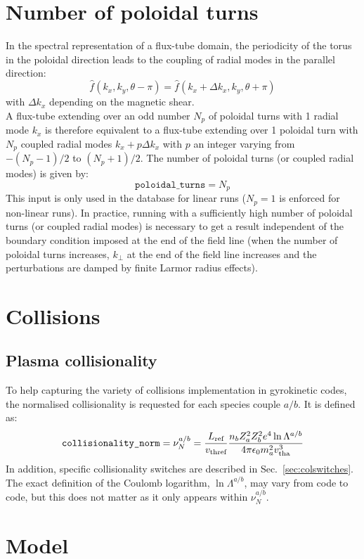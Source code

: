 \documentclass[a4paper]{report}
\begin{document}
\section{Number of poloidal turns} \label{sec:polturns}
In the spectral representation of a flux-tube domain, the periodicity of the torus in the poloidal direction leads to the coupling of radial modes in the parallel direction:
$$\hat{f}(k_x,k_y,\theta-\pi)=\hat{f}(k_x+\Delta k_x,k_y,\theta+\pi)$$
with $\Delta k_x$ depending on the magnetic shear.\\
A flux-tube extending over an odd number $N_p$ of poloidal turns with 1 radial mode $k_x$ is therefore equivalent to a flux-tube extending over 1 poloidal turn with $N_p$ coupled radial modes $k_x + p\Delta k_x$ with $p$ an integer varying from $-(N_p-1)/2$ to $(N_p+1)/2$. The number of poloidal turns (or coupled radial modes) is given by:
$$\texttt{poloidal\_turns}=N_p$$
This input is only used in the database for linear runs ($N_p=1$ is enforced for non-linear runs).
In practice, running with a sufficiently high number of poloidal turns (or coupled radial modes) is necessary to get a result independent of the boundary condition imposed at the end of the field line (when the number of poloidal turns increases, $k_\perp$ at the end of the field line increases and the perturbations are damped by finite Larmor radius effects). 

\section{Collisions}
\subsection{Plasma collisionality} \label{sec:collisionality}
To help capturing the variety of collisions implementation in gyrokinetic codes, the normalised collisionality is requested for each species couple $a/b$. It is defined as:
$$\texttt{collisionality\_norm}=\nu^{a/b}_N=\frac{L_{\textrm{ref}}}{v_\textrm{thref}}\frac{n_bZ_a^2Z_b^2e^4\ln \Lambda^{a/b}}{4\pi\epsilon_0m_a^2v_\textrm{tha}^3}$$
In addition, specific collisionality switches are described in Sec.~\ref{sec:colswitches}. The exact definition of the Coulomb logarithm, $\ln \Lambda^{a/b}$, may vary from code to code, but this does not matter as it only appears within $\nu^{a/b}_N$.\\


\section{Model} 
\end{document}
